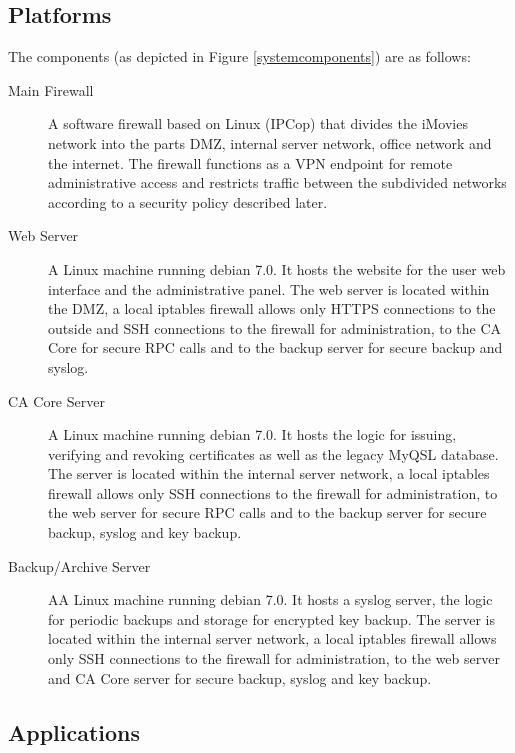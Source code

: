 \documentclass[a4paper, toc=index, 12pt, DIV14, twoside, BCOR2cm, headsepline, numbers=noenddot, bibliography=totoc]{scrbook}
\begin{document}
\subsection{Platforms}
The components (as depicted in Figure \ref{systemcomponents}) are as follows:
\begin{description}
\item[Main Firewall] A software firewall based on Linux (IPCop) that divides the iMovies network into the parts DMZ, internal server network, office network and the internet. The firewall functions as a VPN endpoint for remote administrative access and restricts traffic between the subdivided networks according to a security policy described later.

\item[Web Server] A Linux machine running debian 7.0. It hosts the website for the user web interface and the administrative panel. The web server is located within the DMZ, a local iptables firewall allows only HTTPS connections to the outside and SSH connections to the firewall for administration, to the CA Core for secure RPC calls and to the backup server for secure backup and syslog.

\item[CA Core Server] A Linux machine running debian 7.0. It hosts the logic for issuing, verifying and revoking certificates as well as the legacy MyQSL database. The server is located within the internal server network, a local iptables firewall allows only SSH connections to the firewall for administration, to the web server for secure RPC calls and to the backup server for secure backup, syslog and key backup.

\item[Backup/Archive Server] AA Linux machine running debian 7.0. It hosts a syslog server, the logic for periodic backups and storage for encrypted key backup. The server is located within the internal server network, a local iptables firewall allows only SSH connections to the firewall for administration, to the web server and CA Core server for secure backup, syslog and key backup.
\end{description}

\subsection{Applications}
\end{document}
